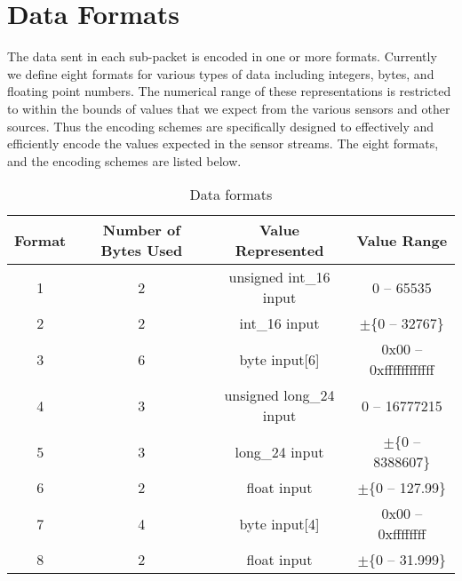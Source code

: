 %

\newpage
\section{Data Formats}

The data sent in each sub-packet is encoded in one or more formats. Currently
we define eight formats for various types of data including integers, bytes,
and floating point numbers. The numerical range of these representations is
restricted to within the bounds of values that we expect from the various sensors
and other sources. Thus the encoding schemes are specifically designed to
effectively and efficiently encode the values expected in the sensor streams.
The eight formats, and the encoding schemes are listed below.

\begin{table}[H]
    \centering
    {
    \begin{tabular}{|c|c|c|c|}
        \hline
        \textbf{Format} & \textbf{Number of Bytes Used} & \textbf{Value Represented} & \textbf{Value Range} \\
        \hline
        \hline
        1 & 2 & unsigned int\_16 input & 0 -- 65535 \\ %
        2 & 2 & int\_16 input & $\pm$\{0 -- 32767\} \\%
        3 & 6 & byte input[6] & 0x00 -- 0xffffffffffff \\%
        4 & 3 & unsigned long\_24 input & 0 -- 16777215 \\%
        5 & 3 & long\_24 input & $\pm$\{0 -- 8388607\} \\%
        6 & 2 & float input & $\pm$\{0 -- 127.99\} \\%
        7 & 4 & byte input[4] & 0x00 -- 0xffffffff \\%
        8 & 2 & float input & $\pm$\{0 -- 31.999\} \\%
        \hline
    \end{tabular}
    }
    \caption{Data formats}
    \label{table:overall}
\end{table}

